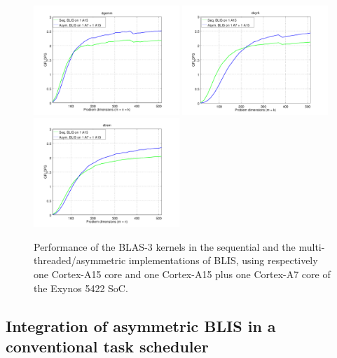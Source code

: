 \begin{figure}[t]
\centering
\includegraphics[width=0.49\textwidth]{Plots/BLIS_small/blis_dgemm_sym_asym}
\includegraphics[width=0.49\textwidth]{Plots/BLIS_small/blis_dsyrk_sym_asym}
\includegraphics[width=0.49\textwidth]{Plots/BLIS_small/blis_dtrsm_sym_asym}
\caption{Performance of the BLAS-3 kernels in the sequential and the multi-threaded/asymmetric implementations of
         BLIS, using respectively one Cortex-A15 core and one Cortex-A15 plus one Cortex-A7 core
         of the Exynos 5422 SoC.}
\label{fig:cross_blis}
\end{figure}


\subsection{Integration of asymmetric BLIS in a conventional task scheduler}


